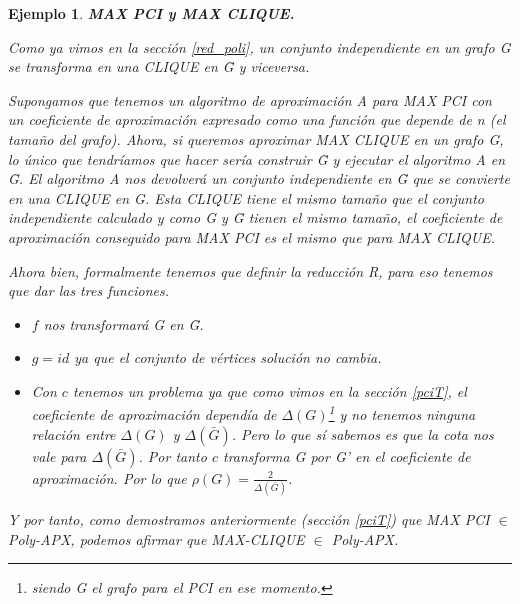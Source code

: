 \documentclass[a4paper,12pt,titlepage]{article}
\newtheorem{eje}{Ejemplo}[section]
\begin{document}
\begin{eje}

\textbf{MAX PCI y MAX CLIQUE.}

Como ya vimos en la secci\'on \ref{red_poli}, un conjunto independiente en un grafo G se transforma en una CLIQUE en \=G y viceversa.

Supongamos que tenemos un algoritmo de aproximaci\'on A para MAX PCI con un coeficiente de aproximaci\'on expresado como una funci\'on que depende de n (el tamaño del grafo). Ahora, si queremos aproximar MAX CLIQUE en un grafo G, lo \'unico que tendr\'iamos que hacer ser\'ia construir \=G y ejecutar el algoritmo A en \=G. El algoritmo A nos devolver\'a un conjunto independiente en \=G que se convierte en una CLIQUE en G. Esta CLIQUE tiene el mismo tamaño que el conjunto independiente calculado y como G y \=G tienen el mismo tamaño, el coeficiente de aproximaci\'on conseguido para MAX PCI es el mismo que para MAX CLIQUE.

Ahora bien, formalmente tenemos que definir la reducci\'on R, para eso tenemos que dar las tres funciones.

\begin{itemize}
\item $f$ nos transformar\'a G en \=G.
\item $g=id$ ya que el conjunto de v\'ertices soluci\'on no cambia.
\item Con $c$ tenemos un problema ya que como vimos en la secci\'on \ref{pciT}, el coeficiente de aproximaci\'on depend\'ia de $\Delta(G)$\footnote{siendo G el grafo para el PCI en ese momento.} y no tenemos ninguna relaci\'on entre $\Delta(G)$ y $\Delta(\bar{G})$. Pero lo que s\'i sabemos es que la cota nos vale para $\Delta(\bar{G})$. Por tanto $c$ transforma G por G' en el coeficiente de aproximaci\'on. Por lo que $\rho(G) = \frac{2}{\Delta(\bar{G})}$.
\end{itemize}

Y por tanto, como demostramos anteriormente (secci\'on \ref{pciT}) que MAX PCI $\in$ Poly-APX, podemos afirmar que MAX-CLIQUE $\in$ Poly-APX.

\end{eje}
\end{document}
